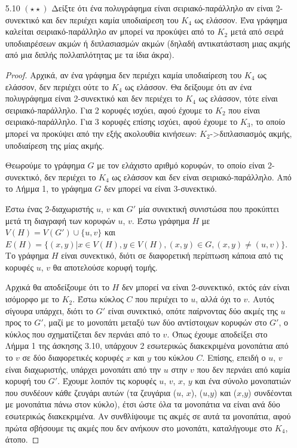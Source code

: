\documentclass[a4paper, oneside, 11pt]{article}
\theoremstyle{definition}
\begin{document}
\begin{enumerate}
\begin{proof}
      Όπου το 4ο βήμα προκύπτει από την ανισότητα Cauchy-Schwarz:

      \[ d(u_1)\cdot1 + d(u_2)\cdot2 + \ldots + d(u_n)\cdot1
         \leq (d^2(u_1) + \ldots + d^2(u_n)) \cdot (1 + \ldots + 1)
         = (d^2(u_1) + \ldots + d^2(u_n)) \cdot n \]

      \end{proof}

   \item[5.10 $(\star \star)$]
Δείξτε ότι ένα πολυγράφημα είναι σειριακό-παράλληλο αν είναι 2-συνεκτικό και δεν περιέχει καμία υποδιαίρεση του $K_4$ ως ελάσσον. Ένα γράφημα καλείται σειριακό-παράλληλο αν μπορεί
να προκύψει από το $K_2$ μετά από σειρά υποδιαιρέσεων ακμών ή διπλασιασμών ακμών (δηλαδή αντικατάσταση μιας ακμής από μια διπλής πολλαπλότητας με τα ίδια άκρα).
	\begin{proof}
Αρχικά, αν ένα γράφημα δεν περιέχει καμία υποδιαίρεση του $K_4$ ως ελάσσον, δεν περιέχει ούτε το $K_4$ ως ελάσσον.
Θα δείξουμε ότι αν ένα πολυγράφημα είναι 2-συνεκτικό και δεν περιέχει το $K_4$ ως ελάσσον, τότε είναι σειριακό-παράλληλο.
Για 2 κορυφές ισχύει, αφού έχουμε το $K_2$ που είναι σειριακό-παράλληλο.
Για 3 κορυφές επίσης ισχύει, αφού έχουμε το $K_3$, το οποίο μπορεί να προκύψει από την εξής ακολουθία κινήσεων: 
$K_2$->διπλασιασμός ακμής, υποδιαίρεση της μίας ακμής.

Θεωρούμε το γράφημα $G$ με τον ελάχιστο αριθμό κορυφών, το οποίο είναι 2-συνεκτικό, δεν περιέχει το $K_4$ ως ελάσσον και δεν είναι σειριακό-παράλληλο. Από το Λήμμα 1, το γράφημα $G$ δεν μπορεί
να είναι 3-συνεκτικό. 

Έστω ένας 2-διαχωριστής $u$, $v$ και $G'$ μία συνεκτική συνιστώσα που προκύπτει μετά τη διαγραφή των κορυφών $u$, $v$. Έστω γράφημα $H$ με 
$V(H)=V(G')\cup \{u,v\}$ και $E(H) = \{(x,y) | x\in V(H), y\in V(H), (x,y)\in G, (x,y)\neq (u,v)\}$. Το γράφημα $H$ είναι συνεκτικό, διότι σε διαφορετική περίπτωση κάποια από τις κορυφές 
$u$, $v$ θα αποτελούσε κορυφή τομής. 

Αρχικά θα αποδείξουμε ότι το $H$ δεν μπορεί να είναι 2-συνεκτικό, εκτός εάν είναι ισόμορφο με το $K_2$. Έστω κύκλος $C$ που περιέχει το $u$, αλλά όχι το $v$. Αυτός σίγουρα υπάρχει, διότι το 
$G'$ είναι συνεκτικό, οπότε παίρνοντας δύο ακμές της $u$ προς το $G'$, μαζί με το μονοπάτι μεταξύ των δύο αντίστοιχων κορυφών στο $G'$, ο κύκλος που σχηματίζεται δεν περνάει από το $v$. Όπως έχουμε
αποδείξει στο Λήμμα 1 της άσκησης 3.10, υπάρχουν 2 εσωτερικώς διακεκριμένα μονοπάτια από το $v$ σε δύο διαφορετικές κορυφές $x$ και $y$ του κύκλου $C$. Επίσης, επειδή ο $u$, $v$ είναι διαχωριστής, 
υπάρχει μονοπάτι
από την $u$ στην $v$ που δεν περνάει από καμία κορυφή του $G'$. Έχουμε λοιπόν τις κορυφές $u$, $v$, $x$, $y$ και ένα σύνολο μονοπατιών που συνδέουν κάθε ζευγάρι αυτών (τα ζευγάρια ($u$, $x$),
($u$,$y$) και ($x$,$y$) συνδέονται με μονοπάτια πάνω στον κύκλο), έτσι ώστε όλα τα μονοπάτια να
είναι ανά δύο εσωτερικώς διακεκριμένα. Αν συνθλίψουμε τις ακμές σε αυτά τα μονοπάτια, αφού πρώτα σβήσουμε τις ακμές που δεν ανήκουν στο μονοπάτι, καταλήγουμε στο $K_4$, άτοπο.


\end{proof}
\end{enumerate}
\end{document}
